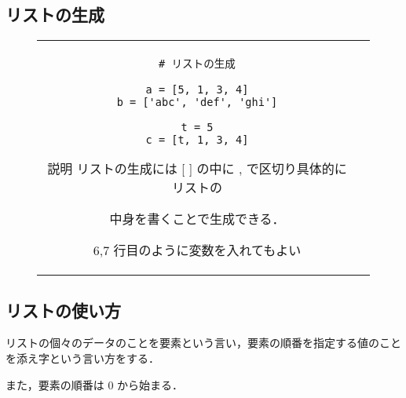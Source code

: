 \documentclass{jsarticle}
\begin{document}
\subsection{リストの生成} \vspace{-10mm}
\begin{figure}[h]
	\begin{tabular}{cc}
		\begin{minipage}[t]{.4\textwidth}
			\begin{lstlisting}[caption=リストの生成]
# リストの生成

a = [5, 1, 3, 4]
b = ['abc', 'def', 'ghi']

t = 5
c = [t, 1, 3, 4]
\end{lstlisting}
		\end{minipage} \hspace{5mm}
		\begin{minipage}[t]{.6\textwidth}
			\begin{itembox}[l]{説明}
				リストの生成には [ ] の中に {\LARGE ,} で区切り具体的にリストの \par
				中身を書くことで生成できる．\par
				6,7 行目のように変数を入れてもよい
			\end{itembox}
		\end{minipage}
	\end{tabular}
\end{figure}


\subsection{リストの使い方}
リストの個々のデータのことを要素という言い，要素の順番を指定する値のことを添え字という言い方をする． \par
また，要素の順番は 0 から始まる．
\end{document}
